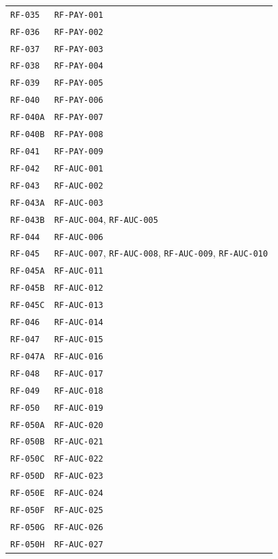 \documentclass[10pt,letterpaper]{article}
\begin{document}
\begin{longtable}{P{3.0cm}P{10.6cm}}
\texttt{RF-035} & \texttt{RF-PAY-001}\\
\texttt{RF-036} & \texttt{RF-PAY-002}\\
\texttt{RF-037} & \texttt{RF-PAY-003}\\
\texttt{RF-038} & \texttt{RF-PAY-004}\\
\texttt{RF-039} & \texttt{RF-PAY-005}\\
\texttt{RF-040} & \texttt{RF-PAY-006}\\
\texttt{RF-040A} & \texttt{RF-PAY-007}\\
\texttt{RF-040B} & \texttt{RF-PAY-008}\\
\texttt{RF-041} & \texttt{RF-PAY-009}\\
\texttt{RF-042} & \texttt{RF-AUC-001}\\
\texttt{RF-043} & \texttt{RF-AUC-002}\\
\texttt{RF-043A} & \texttt{RF-AUC-003}\\
\texttt{RF-043B} & \texttt{RF-AUC-004}, \texttt{RF-AUC-005}\\
\texttt{RF-044} & \texttt{RF-AUC-006}\\
\texttt{RF-045} & \texttt{RF-AUC-007}, \texttt{RF-AUC-008}, \texttt{RF-AUC-009}, \texttt{RF-AUC-010}\\
\texttt{RF-045A} & \texttt{RF-AUC-011}\\
\texttt{RF-045B} & \texttt{RF-AUC-012}\\
\texttt{RF-045C} & \texttt{RF-AUC-013}\\
\texttt{RF-046} & \texttt{RF-AUC-014}\\
\texttt{RF-047} & \texttt{RF-AUC-015}\\
\texttt{RF-047A} & \texttt{RF-AUC-016}\\
\texttt{RF-048} & \texttt{RF-AUC-017}\\
\texttt{RF-049} & \texttt{RF-AUC-018}\\
\texttt{RF-050} & \texttt{RF-AUC-019}\\
\texttt{RF-050A} & \texttt{RF-AUC-020}\\
\texttt{RF-050B} & \texttt{RF-AUC-021}\\
\texttt{RF-050C} & \texttt{RF-AUC-022}\\
\texttt{RF-050D} & \texttt{RF-AUC-023}\\
\texttt{RF-050E} & \texttt{RF-AUC-024}\\
\texttt{RF-050F} & \texttt{RF-AUC-025}\\
\texttt{RF-050G} & \texttt{RF-AUC-026}\\
\texttt{RF-050H} & \texttt{RF-AUC-027}\\

\end{longtable}
\end{document}
